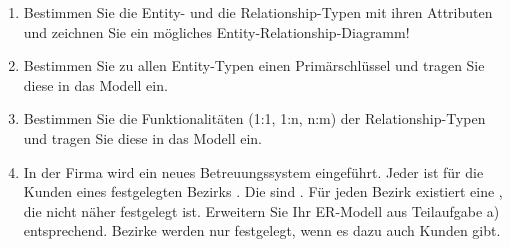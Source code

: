 \documentclass{lehramt-informatik-aufgabe}
\begin{document}
\begin{enumerate}


\item Bestimmen Sie die Entity- und die Relationship-Typen mit ihren
Attributen und zeichnen Sie ein mögliches Entity-Relationship-Diagramm!


\item Bestimmen Sie zu allen Entity-Typen einen Primärschlüssel und
tragen Sie diese in das Modell ein.


\item Bestimmen Sie die Funktionalitäten (1:1, 1:n, n:m) der
Relationship-Typen und tragen Sie diese in das Modell ein.


\item In der Firma wird ein neues Betreuungssystem eingeführt. Jeder
 ist für die Kunden eines festgelegten Bezirks
. Die  sind
. Für jeden Bezirk existiert eine
, die nicht näher festgelegt ist. Erweitern
Sie Ihr ER-Modell aus Teilaufgabe a) entsprechend. Bezirke werden nur
festgelegt, wenn es dazu auch Kunden gibt.

\end{enumerate}
\end{document}
